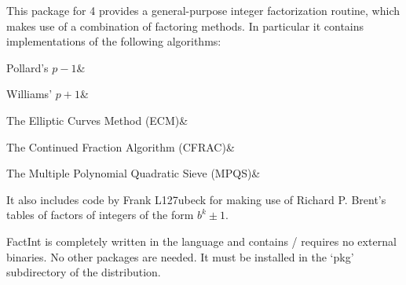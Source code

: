 
This package for {\GAP} 4 provides a general-purpose integer
factorization routine, which makes use of a combination of factoring
methods. In particular it contains implementations of the following
algorithms:

\beginitems
Pollard's $p-1$&

Williams' $p+1$&

The Elliptic Curves Method (ECM)&

The Continued Fraction Algorithm (CFRAC)&

The Multiple Polynomial Quadratic Sieve (MPQS)&
\enditems

It also includes code by Frank L\accent127ubeck for making use of
Richard P. Brent's tables of factors of integers of the form $b^k \pm 1$.

FactInt is completely written in the {\GAP} language and contains /
requires no external binaries. No other packages are needed.
It must be installed in the `pkg' subdirectory of the
{\GAP} distribution.

